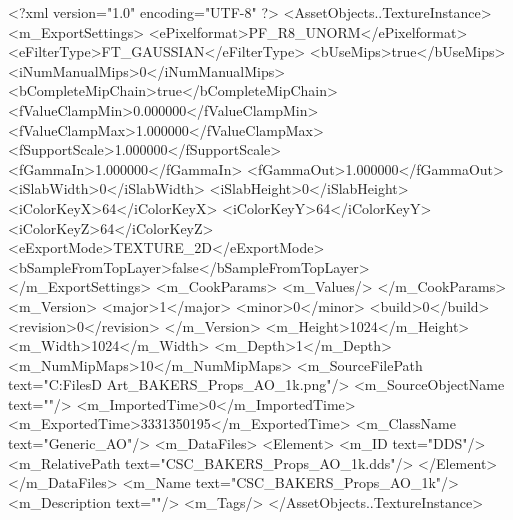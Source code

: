 <?xml version="1.0" encoding="UTF-8" ?>
<AssetObjects..TextureInstance>
	<m_ExportSettings>
		<ePixelformat>PF_R8_UNORM</ePixelformat>
		<eFilterType>FT_GAUSSIAN</eFilterType>
		<bUseMips>true</bUseMips>
		<iNumManualMips>0</iNumManualMips>
		<bCompleteMipChain>true</bCompleteMipChain>
		<fValueClampMin>0.000000</fValueClampMin>
		<fValueClampMax>1.000000</fValueClampMax>
		<fSupportScale>1.000000</fSupportScale>
		<fGammaIn>1.000000</fGammaIn>
		<fGammaOut>1.000000</fGammaOut>
		<iSlabWidth>0</iSlabWidth>
		<iSlabHeight>0</iSlabHeight>
		<iColorKeyX>64</iColorKeyX>
		<iColorKeyY>64</iColorKeyY>
		<iColorKeyZ>64</iColorKeyZ>
		<eExportMode>TEXTURE_2D</eExportMode>
		<bSampleFromTopLayer>false</bSampleFromTopLayer>
	</m_ExportSettings>
	<m_CookParams>
		<m_Values/>
	</m_CookParams>
	<m_Version>
		<major>1</major>
		<minor>0</minor>
		<build>0</build>
		<revision>0</revision>
	</m_Version>
	<m_Height>1024</m_Height>
	<m_Width>1024</m_Width>
	<m_Depth>1</m_Depth>
	<m_NumMipMaps>10</m_NumMipMaps>
	<m_SourceFilePath text="C:\Users\Shadow\Desktop\Working Files\3D Art\Textures\CSC_BAKERS_Props_AO_1k.png"/>
	<m_SourceObjectName text=""/>
	<m_ImportedTime>0</m_ImportedTime>
	<m_ExportedTime>3331350195</m_ExportedTime>
	<m_ClassName text="Generic_AO"/>
	<m_DataFiles>
		<Element>
			<m_ID text="DDS"/>
			<m_RelativePath text="CSC_BAKERS_Props_AO_1k.dds"/>
		</Element>
	</m_DataFiles>
	<m_Name text="CSC_BAKERS_Props_AO_1k"/>
	<m_Description text=""/>
	<m_Tags/>
</AssetObjects..TextureInstance>

